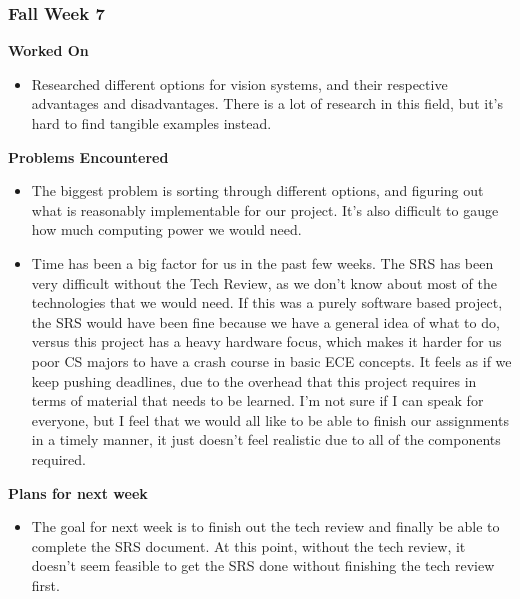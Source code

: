 \documentclass[compsoc,draftclsnofoot,onecolumn,10pt]{IEEEtran}
\begin{document}
\subsubsection*{Fall Week 7}
\textbf{Worked On}
\begin{itemize}
    \item Researched different options for vision systems, and their respective advantages and disadvantages. There is a lot of research in this field, but it's hard to find tangible examples instead.
\end{itemize}
\textbf{Problems Encountered}
\begin{itemize}
    \item The biggest problem is sorting through different options, and figuring out what is reasonably implementable for our project. It's also difficult to gauge how much computing power we would need.\\
    \item Time has been a big factor for us in the past few weeks. The SRS has been very difficult without the Tech Review, as we don't know about most of the technologies that we would need. If this was a purely software based project, the SRS would have been fine because we have a general idea of what to do, versus this project has a heavy hardware focus, which makes it harder for us poor CS majors to have a crash course in basic ECE concepts. It feels as if we keep pushing deadlines, due to the overhead that this project requires in terms of material that needs to be learned. I'm not sure if I can speak for everyone, but I feel that we would all like to be able to finish our assignments in a timely manner, it just doesn't feel realistic due to all of the components required.
\end{itemize}
\textbf{Plans for next week}
\begin{itemize}
    \item The goal for next week is to finish out the tech review and finally be able to complete the SRS document. At this point, without the tech review, it doesn't seem feasible to get the SRS done without finishing the tech review first.
\end{itemize}
\end{document}
